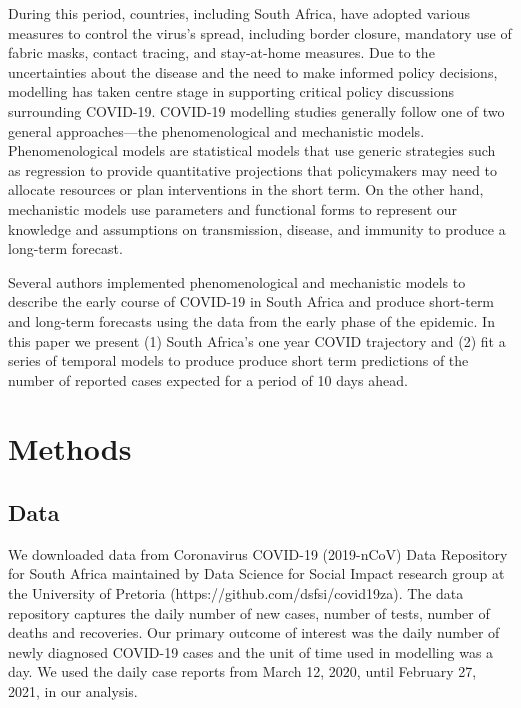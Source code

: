 \documentclass[10pt,letterpaper]{article}
\begin{document}
During this period, countries, including South Africa, have adopted various measures to control the virus's spread, including border closure, mandatory use of fabric masks, contact tracing, and stay-at-home measures. Due to the uncertainties about the disease and the need to make informed policy decisions, modelling has taken centre stage in supporting critical policy discussions surrounding COVID-19. COVID-19 modelling studies generally follow one of two general approaches—the phenomenological and mechanistic models. Phenomenological models are statistical models that use generic strategies such as regression to provide quantitative projections that policymakers may need to allocate resources or plan interventions in the short term. On the other hand, mechanistic models use parameters and functional forms to represent our knowledge and assumptions on transmission, disease, and immunity to produce a long-term forecast. 

Several authors implemented phenomenological and mechanistic models to describe the early course of COVID-19 in South Africa and produce short-term and long-term forecasts using the data from the early phase of the epidemic. In this paper we present (1) South Africa's one year COVID trajectory and (2) fit a series of temporal models to produce produce short term predictions of the number of reported cases expected for a period of 10 days ahead. 


\hypertarget{methods}{%
\section{Methods}\label{methods}}

\hypertarget{data}{%
\subsection{Data}\label{data}}

We downloaded data from Coronavirus COVID-19 (2019-nCoV) Data Repository
for South Africa maintained by Data Science for Social Impact research
group at the University of Pretoria (https://github.com/dsfsi/covid19za). The data repository
captures the daily number of new cases, number of tests, number of
deaths and recoveries. Our primary outcome of interest was the daily
number of newly diagnosed COVID-19 cases and the unit of time used in
modelling was a day. We used the daily case reports from March 12, 2020,
until February 27, 2021, in our analysis.
\end{document}
